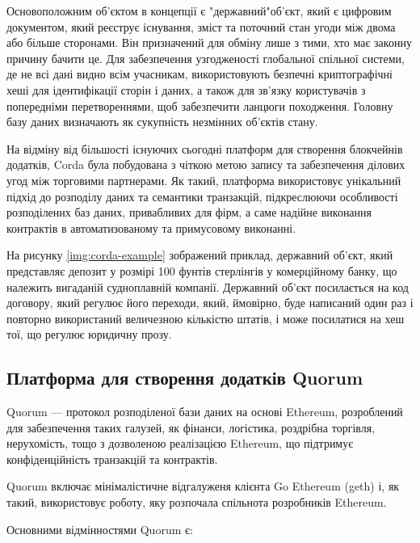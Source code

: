 \documentclass{lib/styles/default-style}
\begin{document}
    Основоположним об'єктом в концепції є "державний"\enspace об'єкт, який є цифровим документом,
    який реєструє існування, зміст та поточний стан угоди між двома або більше сторонами.
    Він призначений для обміну лише з тими, хто має законну причину бачити це.
    Для забезпечення узгодженості глобальної спільної системи, де не всі дані видно всім учасникам,
    використовують безпечні криптографічні хеші для ідентифікації сторін і даних, а також для зв’язку користувачів
    з попередніми перетвореннями,
    щоб забезпечити ланцюги походження. Головну базу даних визначають як сукупність незмінних об'єктів стану.

    На відміну від більшості існуючих сьогодні платформ для створення блокчейнів додатків, Corda була побудована з чіткою метою
    запису та забезпечення ділових угод між торговими партнерами.
    Як такий, платформа використовує унікальний підхід до розподілу даних та семантики транзакцій,
    підкреслюючи особливості розподілених баз даних, привабливих для фірм, а саме надійне виконання контрактів в автоматизованому
    та примусовому виконанні.

    На рисунку \ref{img:corda-example} зображений приклад, державний об'єкт,
    який представляє депозит у розмірі 100 фунтів стерлінгів у комерційному банку,
    що належить вигаданій судноплавній компанії.
    Державний об'єкт посилається на код договору,
    який регулює його переходи, який, ймовірно,
    буде написаний один раз і повторно використаний величезною кількістю штатів, і може посилатися на хеш тої, що регулює юридичну прозу.



\subsection{Платформа для створення додатків Quorum}

    Quorum --- протокол розподіленої бази даних на основі Ethereum, розроблений для забезпечення таких галузей,
    як фінанси, логістика, роздрібна торгівля, нерухомість, тощо з дозволеною реалізацією Ethereum,
    що підтримує конфіденційність транзакцій та контрактів.

    Quorum включає мінімалістичне відгалуженя клієнта Go Ethereum (geth) і,
    як такий, використовує роботу, яку розпочала спільнота розробників Ethereum.

    Основними відмінностями Quorum є:
\end{document}
